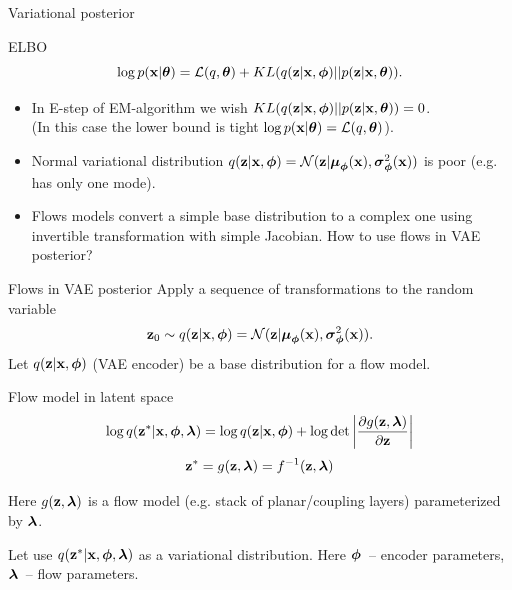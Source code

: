 \begin{frame}{Variational posterior}
	\begin{block}{ELBO}
		\[
		\log p(\mathbf{x} | \boldsymbol{\theta}) = \mathcal{L}(q, \boldsymbol{\theta}) + KL(q(\mathbf{z} | \mathbf{x}, \boldsymbol{\phi}) || p(\mathbf{z} | \mathbf{x}, \boldsymbol{\theta})).
		\]
	\end{block}
	\begin{itemize}
		\item In E-step of EM-algorithm we wish $KL(q(\mathbf{z} | \mathbf{x}, \boldsymbol{\phi}) || p(\mathbf{z} | \mathbf{x}, \boldsymbol{\theta})) = 0$. \\
		(In this case the lower bound is tight $\log p(\mathbf{x} | \boldsymbol{\theta}) = \mathcal{L}(q, \boldsymbol{\theta})$). \\
		\item Normal variational distribution $q(\mathbf{z} | \mathbf{x}, \boldsymbol{\phi}) = \mathcal{N}(\mathbf{z}| \boldsymbol{\mu}_{\boldsymbol{\phi}}(\mathbf{x}), \boldsymbol{\sigma}^2_{\boldsymbol{\phi}}(\mathbf{x}))$ is poor (e.g. has only one mode). \\
		\item Flows models convert a simple base distribution to a complex one using invertible transformation with simple Jacobian. How to use flows in VAE posterior?
	\end{itemize}
\end{frame}
\begin{frame}{Flows in VAE posterior}
	Apply a sequence of transformations to the random variable
	\[
	\mathbf{z}_0 \sim q(\mathbf{z} | \mathbf{x}, \boldsymbol{\phi}) = \mathcal{N}(\mathbf{z}| \boldsymbol{\mu}_{\boldsymbol{\phi}}(\mathbf{x}), \boldsymbol{\sigma}^2_{\boldsymbol{\phi}}(\mathbf{x})).
	\]
	Let $q(\mathbf{z} | \mathbf{x}, \boldsymbol{\phi})$ (VAE encoder) be a base distribution for a flow model.
	
	\begin{block}{Flow model in latent space}
		\vspace{-0.3cm}
		\[
			\log q(\mathbf{z}^* | \mathbf{x}, \boldsymbol{\phi}, \boldsymbol{\lambda}) = \log q(\mathbf{z} | \mathbf{x}, \boldsymbol{\phi}) + \log \det \left | \frac{\partial g(\mathbf{z}, \boldsymbol{\lambda})}{\partial \mathbf{z}}\right|
		\]
		\[
			\mathbf{z}^* = g(\mathbf{z}, \boldsymbol{\lambda}) = f^{-1}(\mathbf{z}, \boldsymbol{\lambda})
		\]
	\end{block}
	Here $g(\mathbf{z}, \boldsymbol{\lambda})$ is a flow model (e.g. stack of planar/coupling layers) parameterized by $\boldsymbol{\lambda}$.
	
	
	Let use $q(\mathbf{z}^* | \mathbf{x}, \boldsymbol{\phi}, \boldsymbol{\lambda})$ as a variational distribution. Here $\boldsymbol{\phi}$~-- encoder parameters, $\boldsymbol{\lambda}$~-- flow parameters.
	
\end{frame}
